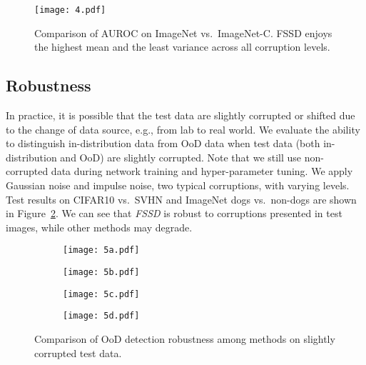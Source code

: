 \documentclass[letterpaper]{article}
\begin{document}
\begin{figure}
    \centering
    \texttt{[image: 4.pdf]}
    \caption{Comparison of AUROC on ImageNet vs.\ ImageNet-C.  FSSD enjoys the highest mean and the least variance across all corruption levels.}
    \label{fig:corruption}
\end{figure}

\subsection{Robustness} 

In practice, it is possible that the test data are slightly corrupted or shifted due to the change of data source, e.g., from lab to real world.
We  evaluate the  ability to distinguish in-distribution data from OoD data when test data (both in-distribution and OoD) are slightly corrupted.
Note that we still use non-corrupted data during network training and hyper-parameter tuning.
We apply Gaussian noise and impulse noise, two typical corruptions, with varying levels.
Test results on CIFAR10 vs.\ SVHN and ImageNet dogs vs.\ non-dogs are shown in Figure~\ref{fig:robustness}.
We can see that \textit{FSSD} is robust to corruptions presented in test images, while  other methods may degrade.


\begin{figure}[t]
\centering
\begin{subfigure}{0.22\textwidth}
  \centering
\texttt{[image: 5a.pdf]} 
\end{subfigure}
\begin{subfigure}{.22\textwidth}
  \centering
\texttt{[image: 5b.pdf]}  
\end{subfigure}
\begin{subfigure}{0.22\textwidth}
  \centering
\texttt{[image:   5c.pdf]} 
\end{subfigure}
\begin{subfigure}{.22\textwidth}
  \centering
\texttt{[image:  5d.pdf]}  


\end{subfigure}
\caption{Comparison of OoD detection robustness among methods on slightly corrupted test data.
}
\label{fig:robustness}
\end{figure}
\end{document}

